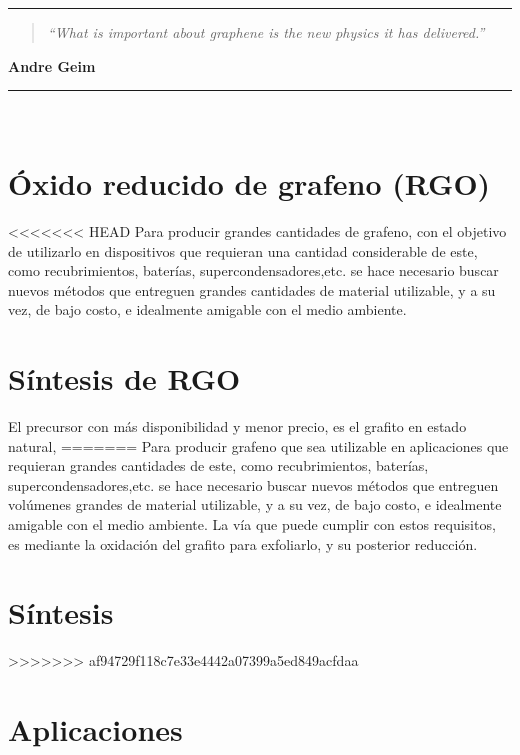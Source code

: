 \noindent
\rule{\linewidth}{1 pt}
\begin{flushright}
	\begin{quotation}
		\small{
			\textit{``What is important about graphene is the new physics it has delivered.''}}
	\end{quotation}
	\bf{Andre Geim}
\end{flushright}
\noindent
\rule{\linewidth}{1 pt}\\
\vfill

\section{Óxido reducido de grafeno (RGO)}
<<<<<<< HEAD
Para producir grandes cantidades de grafeno, con el objetivo de utilizarlo en dispositivos que requieran una cantidad considerable de este, como recubrimientos, baterías, supercondensadores,etc. se hace necesario buscar nuevos métodos que entreguen grandes cantidades de material utilizable, y a su vez, de bajo costo, e idealmente amigable con el medio ambiente. 
\section{Síntesis de RGO}
El precursor con más disponibilidad y menor precio, es el grafito en estado natural, 
=======
Para producir grafeno que sea utilizable en aplicaciones que requieran grandes cantidades de este, como recubrimientos, baterías, supercondensadores,etc. se hace necesario buscar nuevos métodos que entreguen volúmenes grandes de material utilizable, y a su vez, de bajo costo, e idealmente amigable con el medio ambiente. La vía que puede cumplir con estos requisitos, es mediante la oxidación del grafito para exfoliarlo, y su posterior reducción.

\section{Síntesis}
>>>>>>> af94729f118c7e33e4442a07399a5ed849acfdaa


\section{Aplicaciones}